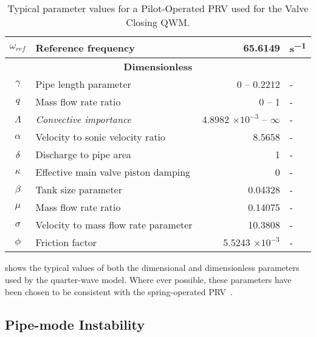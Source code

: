 \begin{table}[ht]
\begin{tabular}{c|l|r|l}
        $\omega_{ref}$ & Reference frequency & 65.6149 & \si{s^{-1}} \\ \hline \hline
        \multicolumn{4}{c}{\textbf{Dimensionless}} \\ \hline
        $\gamma$ & Pipe length parameter & 0 -- 0.2212 & - \\ \hline
        $q$ & Mass flow rate ratio & 0 -- 1 & - \\ \hline
        $\Lambda$ & \textit{Convective importance} & 4.8982 $\times 10^{-3}$ -- $\infty$ & - \\ \hline
        $\alpha$ & Velocity to sonic velocity ratio & 8.5658 & - \\ \hline
        $\delta$ & Discharge to pipe area & 1 & - \\ \hline
        $\kappa$ & Effective main valve piston damping & 0 & - \\ \hline
        $\beta$ & Tank size parameter & 0.04328 & - \\ \hline
        $\mu$ & Mass flow rate ratio & 0.14075 & - \\ \hline
        $\sigma$ & Velocity to mass flow rate parameter & 10.3808 & - \\ \hline
        $\phi$ & Friction factor & 5.5243 $\times 10^{-3}$ & - \\
    \end{tabular}
    \caption{Typical parameter values for a Pilot-Operated PRV used for the Valve Closing QWM.}
    \label{tab: ValveClosingQWMParameterValues}
\end{table}

 shows the typical values of both the dimensional and dimensionless parameters used by the quarter-wave model. Where ever possible, these parameters have been chosen to be consistent with the spring-operated PRV~\cite{Hos2016DynamicService}.

\newpage
\subsection{Pipe-mode Instability}

